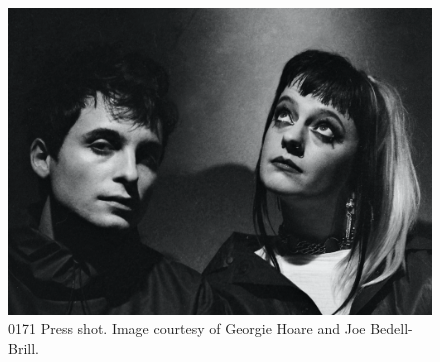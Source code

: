 \begin{figure}[!htb]
    \centering
    \captionsetup{justification=centering}
    \includegraphics[width=1\textwidth]{figures/c7_impact/0171/press/0171-press-shot.png}
    \caption{0171 Press shot. Image courtesy of Georgie Hoare and Joe Bedell-Brill.}
    \label{fig:c7:0171-press-shot}
\end{figure}

